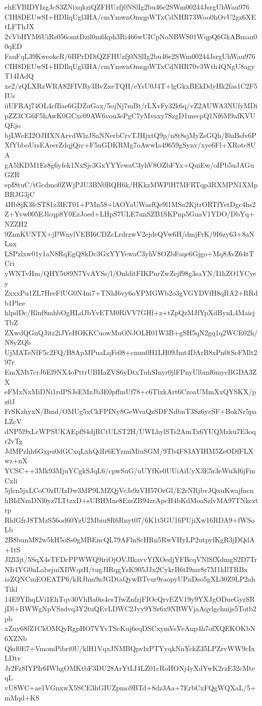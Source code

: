 ehEYBIDYIzgJcS3ZNixqkziQZFHUzfj0NSlIg2bu46e2SWm00244JsrgUhWau976
CIH8DEUwSI+HDIlqUgl3HA/cmYmwnOmqpWTxCdNHR73Woo0hOvU2gz6XEtLFThJX
2vVbHYM6UiRs056omtDzil0m6kph3Ri466wUICpNoNBWS01WqpQ6GkABman00qED
FauFqL39KweokeR/6BPrDDiQZFHUzfj0NSlIg2bu46e2SWm00244JsrgUhWau976
CIH8DEUwSI+HDIlqUgl3HA/cmYmwnOmqpWTxCdNHR70v3Wth4QNgU8agyT14IAdQ
xe2/zQLXRzWRA82FIVRy3BvZxeTQH/eYsU0J4T+lgGkxBEkDdyHk2fas1C2F5IUs
iiUFRAj74OL4cfIlae6GDZuGax/5ojNj7mBt/rLXvFy32k6q/vZ2AUWA3NUfyMDi
pZZ3CG6F5hAwK0GCxc09AW6vou3ePgC7yMvaxy7SzgD1mecpQ1Nf6M9afKVUQEjo
bjLWeEI2OJHXNArvdWlzJSaNNerbCrvTJHjxtQ9p/n8t8sjMyZsGQh/I0aBsfv6P
XfYbboUrsEAeerZdqjQrc+F5nGDKRMg7oAwwIa49659gSynv/xye6Fl+XRotc8UA
gA5lKDM1Es8g6yfek1NxSjc3GxYYYewaC3yhV8OZbFYx+QuiEw/oIPb5uJAGuGZR
epI8tuC/tGcdmo0ZWjPJU3BN0BQH6k/HKkzMWPlH7MFRTqp3RXMPN1XMpBRJG3jC
4Hb8jK3fcST81z3IET01+PMn58+lAOYaUWasfQe9l1MSa2KjtrORTfYetDgc4hs2
Z+Yvw005EJlcqp8Y0EzJoed+LHpS7ULE7unSZB1SKPnp5GuaV1YDO/DbYq+NZZH2
9ZnnKUNTX+jPWnylVEBI6CDZcLrdrzwV2ejdeQVw6H/dmjFrK/9I6zy63+8aNLnx
LSPzlxw01y1aN8RqEgQ8kDc3GxYYYewaC3yhV8OZbFaqe6Gjgo+Mq8AvZ64tTCri
yWNTvHm/QHY5t89N7YvAYSs/l/OnlditFIKPnrZwZejf98g3saYN/I1hZO1YCyey
ZxxxPu1ZL7HreFfUG0N4m7+TNhI6vy6oYPMGWb2o3gVGYDVfH8qRA2+RRdb1Plee
hlpdDc/Rlnf8mhbOgHLdJbYvETM0RiVV7GHf+z+tZpQzMJfYpXdBynL4MaisjTbZ
ZXwdQGnQJitz2iJYeHOKKCuowMuONJOLH01W3B+gSH5qN2gq1q2WCE02h/N8yZQb
UjMATeNfF5c2FQ/B8ApMPuaLqFe08+cmm0H1LH09Jmt4DArB8xPn0tSeFMlt297r
EmXMt7crJ6El9NX4oPttrUBHaZVS6yDtxTuhSInyr0jlFPnyUlbmf6mycBGDA3ZX
eFMxNxMiDNi1rdPSJsEMzJb3E0pffmUf78+c6TlxkArt6CzoaUMmXxQYSKX/pz0J
FrSKzhyxN/Bmd/OMUg5xCkFPINy8GeWvaQzSDFNdbnT3Sz6ycSF+BokNr5paLZcV
dNP5l9xLcWPSUKAEpfS4djRCtULST2H/UWLhylSTs2AmTx6YUQMzku7E3oqr2vTg
JdMPzhh6Gxpu0dGCxqLxhQdIr6EYzmiMiuSGM/9Tb4F83AYIHM5ZeODfFLXwz+nX
YCSC++3Mk93MjuYCgkSJqL6/cpwSuG/uUYfKe0UUiAiUyX3E5r3eWu3d6jFmCxli
5jfcn5jxLCoC0zIUIzDw3MP9LMZQjVcJs9zVH57OrGl/E2rNRjbvJQxuKwajfncn
hBIdNmDNl0yz7LTtzxD+sUBHMue8EzsZB94zrApcH4bKdMoaSzlvMA97TNkcztrp
RldGfrJ8TMzS56od60YzU2Mbiu8R6Rnyt07/6K1t5GU16PUjiXw16RDA9+fWSoLb
2B8bunM82w5kH5oSs0gMBEncQL79AFlnScHRn5RwVHyLP2utpyfKgR3jDQdA+1tS
Jl2l3jt/5SqX4sTFDcPPWWQ9iriOjOVJIkavvYfXOedjYFBcqVNlSfXdmgS2D7Tr
NIi4YG0nLabejuiXIlWqzH/tugJIRqgYzK905JJx2CykrB6tI9mr8r7M1kIlTRBx
iaZQNCmEOEATP6/kRJhm9zJGDtaQywBTvur9raopyUPnDso5gXL30Z9LP2ahTikl
14E9YIhqLVi1EhTqv30VhBa0is4csTfwZnfzjFIOcQrvEZV19y9YXJgODueGyrSR
jDl+BWWgNpVSzdvq3Y2tuQEvLDWC2Jyy9YSr6x9NBWVjaAqylgchuijs5Totb2pb
xZuy68fZ1CkOMQyRgpHO7VYvTScKuj6eqDSCxymVsVeAnp4h7ofXQEKOKbN6XZNb
Qkd0E7+VmomPibri0U/klH1VqxJNMBQpvlxPTYyqkNnYckZ35LPZrvWW9cIxLDtv
Jr2Fz8IYPIr6IWhgOMKtbF3DU28ArYtLI4LZ01cRoHONj4yXdYwK2rzE32cMteqL
vU8WC+ae1VGnxwX5SCE3hGIUZpmo9BTd+8dz3Aa+7ErbCxFQgWQXaL/5+mMqd+KS
